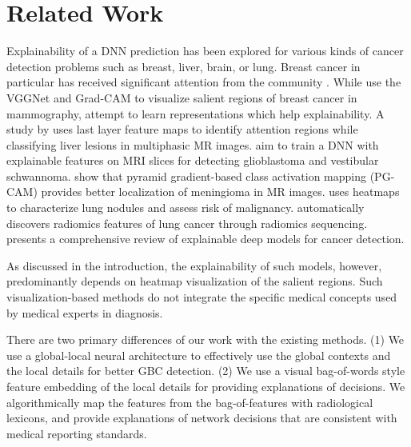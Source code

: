 \section{Related Work}
%
%
Explainability of a DNN prediction has been explored for various kinds of cancer detection problems such as breast, liver, brain, or lung. Breast cancer in particular has received significant attention from the community \cite{dhungel2016automated, samala2018breast, zhou2018radiomics}. While \cite{wang2018breast} use the VGGNet and Grad-CAM to visualize salient regions of breast cancer in mammography, \cite{wu2018deepminer} attempt to learn representations which help explainability. A study by \cite{hamm2019deep} uses last layer feature maps to identify attention regions while classifying liver lesions in multiphasic MR images.  \cite{windisch2020implementation} aim to train a DNN with explainable features on MRI slices for detecting glioblastoma and vestibular schwannoma. \cite{pg-cam} show that pyramid gradient-based class activation mapping (PG-CAM) provides better localization of meningioma in MR images. \cite{venugopal2020unboxing} uses heatmaps to characterize lung nodules and assess risk of malignancy. \cite{kumar2019sisc} automatically discovers radiomics features of lung cancer through radiomics sequencing. \cite{gulum2021review} presents a comprehensive review of explainable deep models for cancer detection.
\par As discussed in the introduction, the explainability of such models, however, predominantly depends on heatmap visualization of the salient regions. Such visualization-based methods do not integrate the specific medical concepts used by medical experts in diagnosis.
\par There are two primary differences of our work with the existing methods. (1) We use a global-local neural architecture to effectively use the global contexts and the local details for better GBC detection. (2) We use a visual bag-of-words style feature embedding of the local details for providing explanations of decisions. We algorithmically map the features from the bag-of-features with radiological lexicons, and provide explanations of network decisions that are consistent with medical reporting standards.

